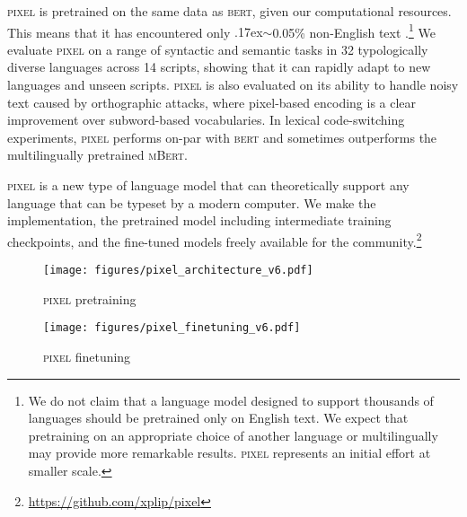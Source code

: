 \documentclass{article}
\newcommand{\model}{\textsc{pixel}\xspace}
\newcommand{\circa}{{\raise.17ex\hbox{$\scriptstyle\sim$}}}
\begin{document}
\model is pretrained on the same data as \textsc{bert}, given our computational resources. This means that it has encountered only \circa0.05\% non-English text \citep{blevins-zettlemoyer-2022-language}.\footnote{We do not claim that a language model designed to support thousands of languages should be pretrained only on English text. 
We expect that pretraining on an appropriate choice of another language or multilingually may provide more remarkable results. \model represents an initial effort at smaller scale.
}
We evaluate \model on a range of syntactic and semantic tasks in 32 typologically diverse languages across 14 scripts, showing that it can rapidly adapt to new languages and unseen scripts. 
\model is also evaluated on its ability to handle noisy text caused by orthographic attacks, where pixel-based encoding is a clear improvement over subword-based vocabularies. In lexical code-switching experiments, \model performs on-par with \textsc{bert} and sometimes outperforms the multilingually pretrained \textsc{mBert}.

\model is a new type of language model that can theoretically support any language that can be typeset by a modern computer. We make the implementation, the pretrained model including intermediate training checkpoints, and the fine-tuned models freely available for the community.\footnote{\url{https://github.com/xplip/pixel}}

\begin{figure*}[t]
    \centering
    \begin{subfigure}[b]{0.48\textwidth}\centering
    \texttt{[image: figures/pixel\_architecture\_v6.pdf]}
    \caption{\model pretraining}
    \end{subfigure}
    \quad
    \begin{subfigure}[b]{0.48\textwidth}\centering
    \texttt{[image: figures/pixel\_finetuning\_v6.pdf]}
    \caption{\model finetuning}
    \end{subfigure}
    \vspace{-2mm}
    \caption{Overview of \model's architecture. Following \cite{he-etal-2022-mae}, we use a masked autoencoder with a ViT architecture and a lightweight decoder for pretraining (left). At finetuning time (right), the decoder is replaced by a task-specific classification head that sits on top of the encoder.}
    \label{fig:architecture}
    \vspace{-4mm}
\end{figure*}
\end{document}
